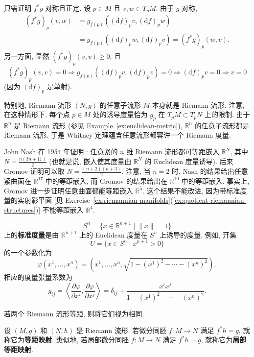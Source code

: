 \begin{RiemannProof}
只需证明 $f^*g$ 对称且正定. 设 $p\in M$ 且 $v,w\in T_pM$. 由于 $g$ 对称,
\begin{align*}
  (f^*g)_p(v,w)&=g_{f(p)}((\mathrm{d}f)_pv,(\mathrm{d}f)_pw)\\
  &=g_{f(p)}((\mathrm{d}f)_pw,(\mathrm{d}f)_pv)=(f^*g)_p(w,v).
\end{align*}
另一方面, 显然 $(f^*g)_p(v,v)\geq0$, 且
\[
  (f^*g)_p(v,v)=0\Rightarrow g_{f(p)}((\mathrm{d}f)_pv,(\mathrm{d}f)_pv)=0
  \Rightarrow(\mathrm{d}f)_pv=0\Rightarrow v=0
\]
(因为 $(\mathrm{d}f)_p$ 是单射).
\end{RiemannProof}

特别地, Riemann 流形 $(N,g)$ 的任意子流形 $M$ 本身就是 Riemann 流形. 注意, 在这种情形下, 每个点 $p\in M$ 处的诱导度量恰为 $g_p$ 在 $T_pM\subset T_pN$ 上的限制. 由于 $\mathbb{R}^n$ 是 Riemann 流形 (参见 Example~\ref{ex:euclidean-metric}), $\mathbb{R}^n$ 的任意子流形都是 Riemann 流形. 于是 Whitney 定理蕴含任意流形都容许一个 Riemann 度量.

John Nash 在 1954 年证明 : 任意紧的 $n$ 维 Riemann 流形都可等距嵌入 $\mathbb{R}^N$, 其中 $N=\frac{n(3n+11)}2$ (也就是说, 嵌入使其度量由 $\mathbb{R}^N$ 的 Euclidean 度量诱导). 后来 Gromov  证明可以取 $N=\frac{(n+2)(n+3)}2$. 注意, 当 $n=2$ 时, Nash 的结果给出任意紧曲面在 $\mathbb{R}^{17}$ 中的等距嵌入, 而 Gromov 的结果给出在 $\mathbb{R}^{10}$ 中的等距嵌入. 事实上, Gromov 进一步证明任意曲面都能等距嵌入 $\mathbb{R}^5$. 这个结果不能改进, 因为带标准度量的实射影平面 [见 Exercise~\ref{ex:riemannian-manifolds}(\ref{ex:quotient-riemannian-structures})] 不能等距嵌入 $\mathbb{R}^4$.

\begin{RiemannExample}\label{ex:standard-metric-of-sphere}
\[
  S^n=\{x\in\mathbb{R}^{n+1}\mid\lVert x\rVert=1\}
\]
上的\textbf{标准度量}是由 $\mathbb{R}^{n+1}$ 上的 Euclidean 度量在 $S^n$ 上诱导的度量. 例如, 开集
\[
  U=\{x\in S^n\mid x^{n+1}>0\}
\]
的一个参数化为
\[
  \varphi(x^1,\ldots,x^n)=\left(x^1,\ldots,x^n,\sqrt{1-(x^1)^2-\cdots-(x^n)^2}\right),
\]
相应的度量张量系数为
\[
  g_{ij}=\left\langle\frac{\partial\varphi}{\partial x^i},\frac{\partial\varphi}{\partial x^j}\right\rangle
  =\delta_{ij}+\frac{x^ix^j}{1-(x^1)^2-\cdots-(x^n)^2}.
\]
\end{RiemannExample}

若两个 Riemann 流形等距, 则将它们视为相同.

\begin{RiemannDefinition}\label{def:isometry-and-local-isometry}
设 $(M,g)$ 和 $(N,h)$ 是 Riemann 流形. 若微分同胚 $f:M\to N$ 满足 $f^*h=g$, 就称它为\textbf{等距映射}. 类似地, 若局部微分同胚 $f:M\to N$ 满足 $f^*h=g$, 就称它为\textbf{局部等距映射}.
\end{RiemannDefinition}

